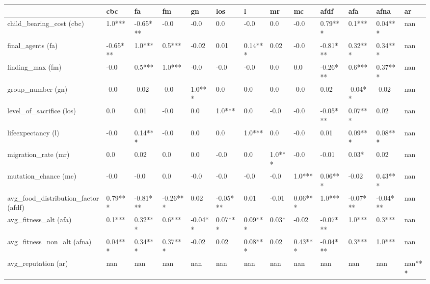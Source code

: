 \begin{tabular}{lllllllllllll}
\toprule
{} &       cbc &        fa &        fm &       gn &       los &        l &      mr &       mc &      afdf &       afa &      afna &      ar \\
\midrule
child\_bearing\_cost (cbc)            &    1.0*** &  -0.65*** &      -0.0 &     -0.0 &       0.0 &     -0.0 &     0.0 &     -0.0 &   0.79*** &    0.1*** &   0.04*** &     nan \\
final\_agents (fa)                   &  -0.65*** &    1.0*** &    0.5*** &    -0.02 &      0.01 &  0.14*** &    0.02 &     -0.0 &  -0.81*** &   0.32*** &   0.34*** &     nan \\
finding\_max (fm)                    &      -0.0 &    0.5*** &    1.0*** &     -0.0 &      -0.0 &     -0.0 &     0.0 &      0.0 &  -0.26*** &    0.6*** &   0.37*** &     nan \\
group\_number (gn)                   &      -0.0 &     -0.02 &      -0.0 &   1.0*** &       0.0 &      0.0 &     0.0 &     -0.0 &      0.02 &   -0.04** &     -0.02 &     nan \\
level\_of\_sacrifice (los)            &       0.0 &      0.01 &      -0.0 &      0.0 &    1.0*** &      0.0 &    -0.0 &     -0.0 &  -0.05*** &   0.07*** &      0.02 &     nan \\
lifeexpectancy (l)                  &      -0.0 &   0.14*** &      -0.0 &      0.0 &       0.0 &   1.0*** &     0.0 &     -0.0 &      0.01 &   0.09*** &   0.08*** &     nan \\
migration\_rate (mr)                 &       0.0 &      0.02 &       0.0 &      0.0 &      -0.0 &      0.0 &  1.0*** &     -0.0 &     -0.01 &     0.03* &      0.02 &     nan \\
mutation\_chance (mc)                &      -0.0 &      -0.0 &       0.0 &     -0.0 &      -0.0 &     -0.0 &    -0.0 &   1.0*** &   0.06*** &     -0.02 &   0.43*** &     nan \\
avg\_food\_distribution\_factor (afdf) &   0.79*** &  -0.81*** &  -0.26*** &     0.02 &  -0.05*** &     0.01 &   -0.01 &  0.06*** &    1.0*** &  -0.07*** &  -0.04*** &     nan \\
avg\_fitness\_alt (afa)               &    0.1*** &   0.32*** &    0.6*** &  -0.04** &   0.07*** &  0.09*** &   0.03* &    -0.02 &  -0.07*** &    1.0*** &    0.3*** &     nan \\
avg\_fitness\_non\_alt (afna)          &   0.04*** &   0.34*** &   0.37*** &    -0.02 &      0.02 &  0.08*** &    0.02 &  0.43*** &  -0.04*** &    0.3*** &    1.0*** &     nan \\
avg\_reputation (ar)                 &       nan &       nan &       nan &      nan &       nan &      nan &     nan &      nan &       nan &       nan &       nan &  nan*** \\
\bottomrule
\end{tabular}
